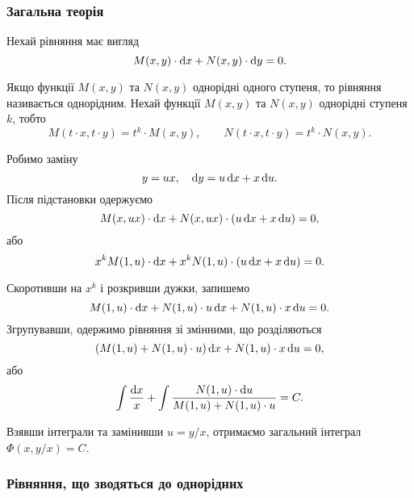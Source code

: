 \subsubsection{Загальна теорія}
Нехай рівняння має вигляд
\begin{equation*}
	M(x, y) \cdot \mathop{}\!\mathrm{d}	x + N(x, y) \cdot \mathop{}\!\mathrm{d} y = 0.
\end{equation*}

Якщо функції $M(x, y)$ та $N(x, y)$ однорідні одного ступеня, то рівняння називається однорідним. Нехай функції $M(x, y)$ та $N(x, y)$ однорідні ступеня $k$, тобто
\begin{equation*}
	M(t \cdot x, t \cdot y) = t^k \cdot M(x, y), \qquad N(t \cdot x, t \cdot y) = t^k \cdot N(x, y).
\end{equation*}

Робимо заміну 
\begin{equation*}
	y = u x, \quad \mathop{}\!\mathrm{d} y = u \mathop{}\!\mathrm{d} x + x \mathop{}\!\mathrm{d} u.
\end{equation*}
Після підстановки одержуємо
\begin{equation*}
	M(x, u x) \cdot \mathop{}\!\mathrm{d} x + N(x, u x) \cdot (u \mathop{}\!\mathrm{d} x + x \mathop{}\!\mathrm{d} u) = 0,
\end{equation*}
або 
\begin{equation*}
	x^k M(1, u) \cdot \mathop{}\!\mathrm{d} x + x^k N(1, u) \cdot (u \mathop{}\!\mathrm{d} x + x \mathop{}\!\mathrm{d} u) = 0.
\end{equation*}

Скоротивши на $x^k$ і розкривши дужки, запишемо 
\begin{equation*}
	M(1, u) \cdot \mathop{}\!\mathrm{d} x + N(1, u) \cdot u \mathop{}\!\mathrm{d} x + N(1, u) \cdot x \mathop{}\!\mathrm{d} u = 0.
\end{equation*}
Згрупувавши, одержимо рівняння зі змінними, що розділяються
\begin{equation*}
	(M(1, u) + N(1, u) \cdot u) \mathop{}\!\mathrm{d} x + N(1, u) \cdot x \mathop{}\!\mathrm{d} u = 0,
\end{equation*}
або 
\begin{equation*}
	\int \frac{\mathop{}\!\mathrm{d} x}{x} + \int \frac{N(1, u) \cdot \mathop{}\!\mathrm{d} u}{M(1, u) + N(1, u) \cdot u} = C.
\end{equation*}

Взявши інтеграли та замінивши $u = y / x$, отримаємо загальний інтеграл $\Phi(x, y / x) = C$.

\subsubsection{Рівняння, що зводяться до однорідних}

